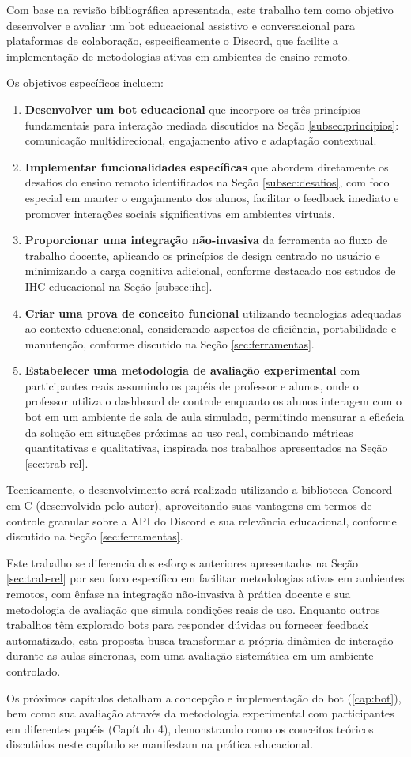 Com base na revisão bibliográfica apresentada, este trabalho tem como objetivo desenvolver e avaliar um bot educacional assistivo e conversacional para plataformas de colaboração, especificamente o Discord, que facilite a implementação de metodologias ativas em ambientes de ensino remoto.

Os objetivos específicos incluem:

\begin{enumerate}
\item \textbf{Desenvolver um bot educacional} que incorpore os três princípios fundamentais para interação mediada discutidos na Seção \ref{subsec:principios}: comunicação multidirecional, engajamento ativo e adaptação contextual.
\item \textbf{Implementar funcionalidades específicas} que abordem diretamente os desafios do ensino remoto identificados na Seção \ref{subsec:desafios}, com foco especial em manter o engajamento dos alunos, facilitar o feedback imediato e promover interações sociais significativas em ambientes virtuais.
\item \textbf{Proporcionar uma integração não-invasiva} da ferramenta ao fluxo de trabalho docente, aplicando os princípios de design centrado no usuário e minimizando a carga cognitiva adicional, conforme destacado nos estudos de IHC educacional na Seção \ref{subsec:ihc}.
\item \textbf{Criar uma prova de conceito funcional} utilizando tecnologias adequadas ao contexto educacional, considerando aspectos de eficiência, portabilidade e manutenção, conforme discutido na Seção \ref{sec:ferramentas}.
\item \textbf{Estabelecer uma metodologia de avaliação experimental} com participantes reais assumindo os papéis de professor e alunos, onde o professor utiliza o dashboard de controle enquanto os alunos interagem com o bot em um ambiente de sala de aula simulado, permitindo mensurar a eficácia da solução em situações próximas ao uso real, combinando métricas quantitativas e qualitativas, inspirada nos trabalhos apresentados na Seção \ref{sec:trab-rel}.
\end{enumerate}

Tecnicamente, o desenvolvimento será realizado utilizando a biblioteca Concord em C (desenvolvida pelo autor), aproveitando suas vantagens em termos de controle granular sobre a API do Discord e sua relevância educacional, conforme discutido na Seção \ref{sec:ferramentas}.

Este trabalho se diferencia dos esforços anteriores apresentados na Seção \ref{sec:trab-rel} por seu foco específico em facilitar metodologias ativas em ambientes remotos, com ênfase na integração não-invasiva à prática docente e sua metodologia de avaliação que simula condições reais de uso. Enquanto outros trabalhos têm explorado bots para responder dúvidas ou fornecer feedback automatizado, esta proposta busca transformar a própria dinâmica de interação durante as aulas síncronas, com uma avaliação sistemática em um ambiente controlado.

Os próximos capítulos detalham a concepção e implementação do bot (\ref{cap:bot}), bem como sua avaliação através da metodologia experimental com participantes em diferentes papéis (Capítulo 4), demonstrando como os conceitos teóricos discutidos neste capítulo se manifestam na prática educacional.